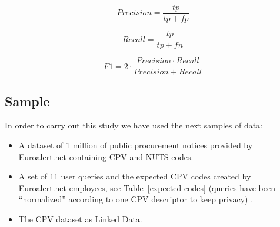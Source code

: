 \begin{figure}[ht]
\begin{minipage}[b]{0.45\linewidth}
\centering
\begin{equation}\label{eq-1}
Precision = \frac{tp}{tp+fp} 
\end{equation}
\end{minipage}
\hspace{0.5cm}
\begin{minipage}[b]{0.45\linewidth}
\centering
\begin{equation}\label{eq-2}
Recall = \frac{tp}{tp+fn}
\end{equation}
\end{minipage}
\end{figure}


\begin{equation}\label{eq-3}
F1 = 2 \cdot \frac{Precision \cdot Recall}{ Precision + Recall}
\end{equation}




\subsection{Sample}
In order to carry out this study we have used the next samples of data:
\begin{itemize}
\item A dataset of 1 million of public procurement notices provided by Euroalert.net containing CPV and NUTS codes.
\item A set of 11 user queries and the expected CPV codes created by Euroalert.net employees, see Table~\ref{expected-codes} (queries have been ``normalized'' according to one CPV descriptor to keep privacy) .
\item The CPV dataset as Linked Data.
\end{itemize}



